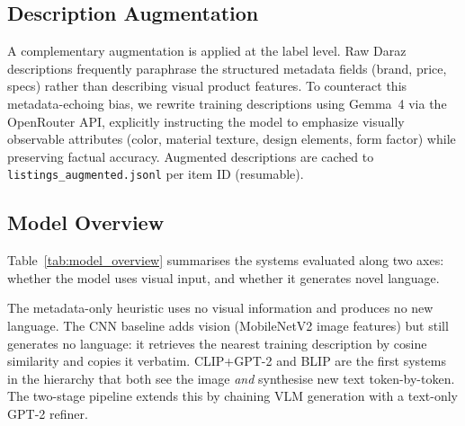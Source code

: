 \documentclass[12pt,a4paper]{article}
\begin{document}
\subsection{Description Augmentation}

A complementary augmentation is applied at the label level. Raw Daraz descriptions
frequently paraphrase the structured metadata fields (brand, price, specs) rather than
describing visual product features. To counteract this metadata-echoing bias, we
rewrite training descriptions using Gemma~4 via the OpenRouter API, explicitly
instructing the model to emphasize visually observable attributes (color, material
texture, design elements, form factor) while preserving factual accuracy. Augmented
descriptions are cached to \texttt{listings\_augmented.jsonl} per item ID (resumable).

\subsection{Model Overview}

Table~\ref{tab:model_overview} summarises the systems evaluated along two axes:
whether the model uses visual input, and whether it generates novel language.

\begin{table}[H]
\centering
\caption{Capability comparison across all evaluated systems.}
\label{tab:model_overview}
\end{table}

The metadata-only heuristic uses no visual information and produces no new language.
The CNN baseline adds vision (MobileNetV2 image features) but still generates no
language: it retrieves the nearest training description by cosine similarity and copies
it verbatim. CLIP+GPT-2 and BLIP are the first systems in the hierarchy that both see
the image \emph{and} synthesise new text token-by-token. The two-stage pipeline extends
this by chaining VLM generation with a text-only GPT-2 refiner.
\end{document}
